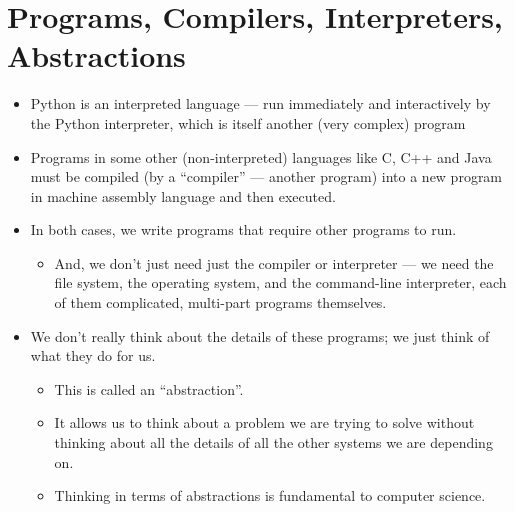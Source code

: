 \documentclass[letterpaper,10pt,english]{sphinxmanual}
\begin{document}
\section{Programs, Compilers, Interpreters, Abstractions}
\label{\detokenize{lecture_notes/lec01_intro:programs-compilers-interpreters-abstractions}}\begin{itemize}
\item {} 
Python is an interpreted language — run immediately and interactively
by the Python interpreter, which is itself another (very complex)
program

\item {} 
Programs in some other (non-interpreted) languages like C, C++ and
Java must be compiled (by a “compiler” — another program) into a new
program in machine assembly language and then executed.

\item {} 
In both cases, we write programs that require other programs to run.
\begin{itemize}
\item {} 
And, we don’t just need just the compiler or interpreter — we need
the file system, the operating system, and the command-line
interpreter, each of them complicated, multi-part programs
themselves.

\end{itemize}

\item {} 
We don’t really think about the details of these programs; we just
think of what they do for us.
\begin{itemize}
\item {} 
This is called an “abstraction”.

\item {} 
It allows us to think about a problem we are trying to solve
without thinking about all the details of all the other systems we
are depending on.

\item {} 
Thinking in terms of abstractions is fundamental to computer
science.

\end{itemize}

\end{itemize}
\end{document}
